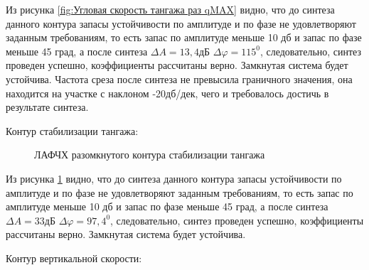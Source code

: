 Из рисунка \ref{fig:Угловая скорость тангажа раз qMAX} видно, что до синтеза данного контура запасы устойчивости по амплитуде и по фазе не удовлетворяют заданным требованиям, то есть запас по амплитуде меньше 10 дб и запас по фазе меньше 45 град, а после синтеза $\Delta A = 13,4 $дБ $\Delta \varphi = 115^0$, следовательно, синтез проведен успешно, коэффициенты рассчитаны верно. Замкнутая система будет устойчива. Частота среза после синтеза не превысила граничного значения, она находится на участке с наклоном -20дб/дек, чего и требовалось достичь в результате синтеза.  

\begin{center}
    Контур стабилизации тангажа:
\end{center}

\begin{figure}[H]
    \caption{ЛАФЧХ разомкнутого контура стабилизации тангажа}
    \label{fig:Тангаж раз qMAX}
\end{figure}

Из рисунка \ref{fig:Тангаж раз qMAX} видно, что до синтеза данного контура запасы устойчивости по амплитуде и по фазе не удовлетворяют заданным требованиям, то есть запас по амплитуде меньше 10 дб и запас по фазе меньше 45 град, а после синтеза $\Delta A = 33 $дБ $\Delta \varphi = 97,4^0$, следовательно, синтез проведен успешно, коэффициенты рассчитаны верно. Замкнутая система будет устойчива.  

\begin{center}
    Контур вертикальной скорости:
\end{center}

